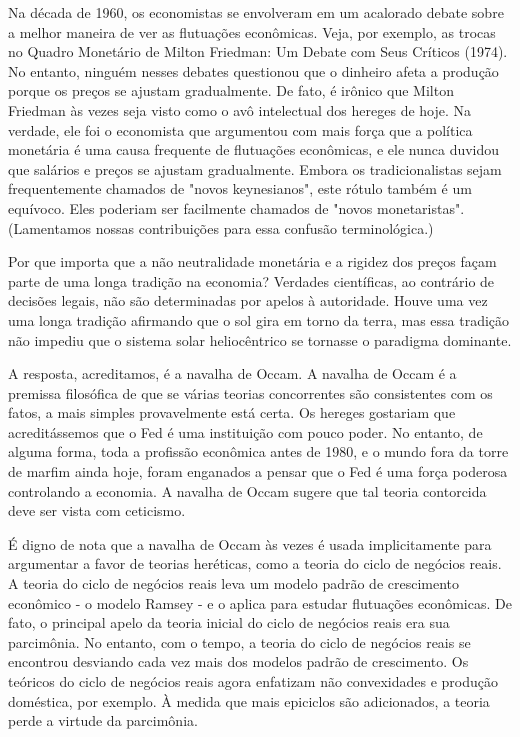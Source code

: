 \documentclass[a4paper,12pt]{article}[abntex2]
\begin{document}
Na década de 1960, os economistas se envolveram em um acalorado debate sobre a melhor maneira de ver as flutuações econômicas. Veja, por exemplo, as trocas no Quadro Monetário de Milton Friedman: Um Debate com Seus Críticos (1974). No entanto, ninguém nesses debates questionou que o dinheiro afeta a produção porque os preços se ajustam gradualmente. De fato, é irônico que Milton Friedman às vezes seja visto como o avô intelectual dos hereges de hoje. Na verdade, ele foi o economista que argumentou com mais força que a política monetária é uma causa frequente de flutuações econômicas, e ele nunca duvidou que salários e preços se ajustam gradualmente. Embora os tradicionalistas sejam frequentemente chamados de "novos keynesianos", este rótulo também é um equívoco. Eles poderiam ser facilmente chamados de "novos monetaristas". (Lamentamos nossas contribuições para essa confusão terminológica.)

Por que importa que a não neutralidade monetária e a rigidez dos preços façam parte de uma longa tradição na economia? Verdades científicas, ao contrário de decisões legais, não são determinadas por apelos à autoridade. Houve uma vez uma longa tradição afirmando que o sol gira em torno da terra, mas essa tradição não impediu que o sistema solar heliocêntrico se tornasse o paradigma dominante.

A resposta, acreditamos, é a navalha de Occam. A navalha de Occam é a premissa filosófica de que se várias teorias concorrentes são consistentes com os fatos, a mais simples provavelmente está certa. Os hereges gostariam que acreditássemos que o Fed é uma instituição com pouco poder. No entanto, de alguma forma, toda a profissão econômica antes de 1980, e o mundo fora da torre de marfim ainda hoje, foram enganados a pensar que o Fed é uma força poderosa controlando a economia. A navalha de Occam sugere que tal teoria contorcida deve ser vista com ceticismo.

É digno de nota que a navalha de Occam às vezes é usada implicitamente para argumentar a favor de teorias heréticas, como a teoria do ciclo de negócios reais. A teoria do ciclo de negócios reais leva um modelo padrão de crescimento econômico - o modelo Ramsey - e o aplica para estudar flutuações econômicas. De fato, o principal apelo da teoria inicial do ciclo de negócios reais era sua parcimônia. No entanto, com o tempo, a teoria do ciclo de negócios reais se encontrou desviando cada vez mais dos modelos padrão de crescimento. Os teóricos do ciclo de negócios reais agora enfatizam não convexidades e produção doméstica, por exemplo. À medida que mais epiciclos são adicionados, a teoria perde a virtude da parcimônia.
\end{document}
